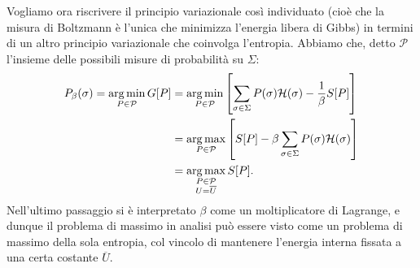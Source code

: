Vogliamo ora riscrivere il principio variazionale così individuato (cioè che la misura di Boltzmann è l'unica che minimizza l'energia libera di Gibbs) in termini di un altro principio variazionale che coinvolga l'entropia. Abbiamo che, detto $ \mathcal{P} $ l'insieme delle possibili misure di probabilità su $ \Sigma $:
\begin{align*}
    P_\beta(\sigma) = \operatorname*{arg\, min}_{P\in\mathcal{P}} G[P] & = \operatorname*{arg\, min}_{P\in\mathcal{P}} \left[ \sum_{\sigma\in\Sigma} P(\sigma) \mathcal{H}(\sigma) - \frac{1}{\beta} S[P] \right]\\
                                                     & = \operatorname*{arg\, max}_{P\in\mathcal{P}} \left[ S[P] - \beta \sum_{\sigma\in\Sigma}P(\sigma)\mathcal{H}(\sigma) \right]\\
                                                     & = \operatorname*{arg\, max}_{\substack{P\in\mathcal{P}\\ U=\overline{U}}} S[P].
\end{align*}
Nell'ultimo passaggio si è interpretato $ \beta $ come un moltiplicatore di Lagrange, e dunque il problema di massimo in analisi può essere visto come un problema di massimo della sola entropia, col vincolo di mantenere l'energia interna fissata a una certa costante $ \overline{U} $.

